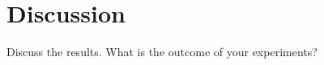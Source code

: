\chapter{Discussion}\label{chap:discussion}

Discuss the results. What is the outcome of your experiments?